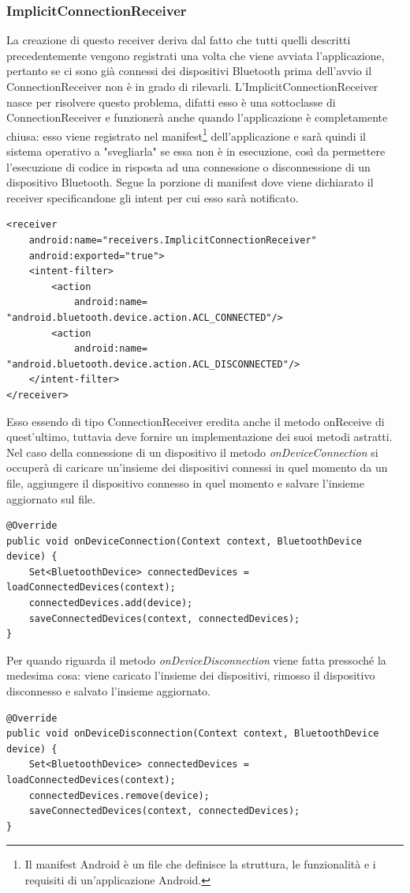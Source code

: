 \subsubsection{ImplicitConnectionReceiver}
La creazione di questo receiver deriva dal fatto che tutti quelli descritti precedentemente vengono registrati una volta che viene avviata l'applicazione, pertanto se ci sono già connessi dei dispositivi Bluetooth prima dell'avvio il ConnectionReceiver non è in grado di rilevarli. L'ImplicitConnectionReceiver nasce per risolvere questo problema, difatti esso è una sottoclasse di ConnectionReceiver e funzionerà anche quando l'applicazione è completamente chiusa: esso viene registrato nel manifest\footnote{Il manifest Android è un file che definisce la struttura, le funzionalità e i requisiti di un'applicazione Android.} dell'applicazione e sarà quindi il sistema operativo a "svegliarla" se essa non è in esecuzione, così da permettere l'esecuzione di codice in risposta ad una connessione o disconnessione di un dispositivo Bluetooth. Segue la porzione di manifest dove viene dichiarato il receiver specificandone gli intent per cui esso sarà notificato.
\begin{verbatim}
<receiver 
    android:name="receivers.ImplicitConnectionReceiver"
    android:exported="true">
    <intent-filter>
        <action 
            android:name= "android.bluetooth.device.action.ACL_CONNECTED"/>
        <action
            android:name= "android.bluetooth.device.action.ACL_DISCONNECTED"/>
    </intent-filter>
</receiver>
\end{verbatim}

Esso essendo di tipo ConnectionReceiver eredita anche il metodo onReceive di quest'ultimo, tuttavia deve fornire un implementazione dei suoi metodi astratti. Nel caso della connessione di un dispositivo il metodo \textit{onDeviceConnection} si occuperà di caricare un'insieme dei dispositivi connessi in quel momento da un file, aggiungere il dispositivo connesso in quel momento e salvare l'insieme aggiornato sul file.
\begin{verbatim}
@Override
public void onDeviceConnection(Context context, BluetoothDevice device) {
    Set<BluetoothDevice> connectedDevices = loadConnectedDevices(context);
    connectedDevices.add(device);
    saveConnectedDevices(context, connectedDevices);
}
\end{verbatim}

Per quando riguarda il metodo \textit{onDeviceDisconnection} viene fatta pressoché la medesima cosa: viene caricato l'insieme dei dispositivi, rimosso il dispositivo disconnesso e salvato l'insieme aggiornato.
\begin{verbatim}
@Override
public void onDeviceDisconnection(Context context, BluetoothDevice device) {
    Set<BluetoothDevice> connectedDevices = loadConnectedDevices(context);
    connectedDevices.remove(device);
    saveConnectedDevices(context, connectedDevices);
}
\end{verbatim}


